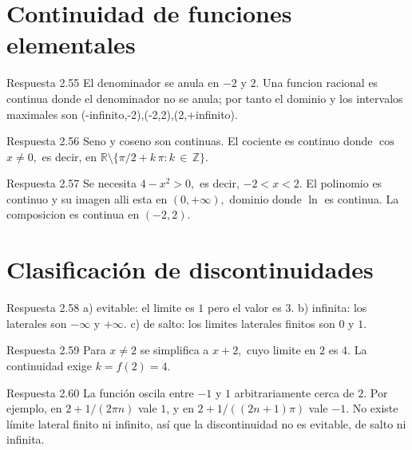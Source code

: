 \documentclass[10pt,a4paper,oneside,openany]{book}
\begin{document}
\section{Continuidad de funciones elementales}
\begin{PSevenAnswerFixed}{Respuesta 2.55}
El denominador se anula en \(-2\) y \(2\). Una funcion racional es continua donde el denominador no se anula; por tanto el dominio y los intervalos maximales son (-infinito,-2),(-2,2),(2,+infinito).
\end{PSevenAnswerFixed}
\begin{PSevenAnswerFixed}{Respuesta 2.56}
Seno y coseno son continuas. El cociente es continuo donde \(\cos\) \(x\ne 0,\) es decir, en \(\mathbb{R}\setminus \{\pi /2+k\,\pi :k\,\in \,\mathbb{Z}\}\).
\end{PSevenAnswerFixed}
\begin{PSevenAnswerFixed}{Respuesta 2.57}
Se necesita \(4-x^{2}>0,\) es decir, \(-2<x<2\). El polinomio es continuo y su imagen alli esta en \((0,+\infty ),\) dominio donde \(\ln\) es continua. La composicion es continua en \((-2,2)\).
\end{PSevenAnswerFixed}
\section{Clasificación de discontinuidades}
\begin{PSevenAnswerFixed}{Respuesta 2.58}
a) evitable: el limite es \(1\) pero el valor es \(3\). b) infinita: los laterales son \(-\infty \) y \(+\infty \). c) de salto: los limites laterales finitos son \(0\) y \(1\).
\end{PSevenAnswerFixed}
\begin{PSevenAnswerFixed}{Respuesta 2.59}
Para \(x\ne 2\) se simplifica a \(x+2,\) cuyo limite en \(2\) es \(4\). La continuidad exige \(k=f(2)=4\).
\end{PSevenAnswerFixed}
\begin{PSevenAnswerFixed}{Respuesta 2.60}
La función oscila entre \(-1\) y \(1\) arbitrariamente cerca de \(2\). Por ejemplo, en \(2+1/(2\pi n)\) vale \(1\), y en \(2+1/((2n+1)\pi)\) vale \(-1\). No existe límite lateral finito ni infinito, así que la discontinuidad no es evitable, de salto ni infinita.
\end{PSevenAnswerFixed}
\end{document}
